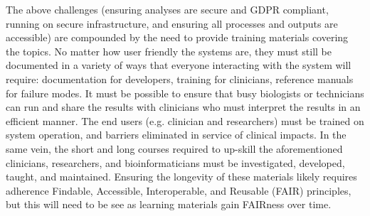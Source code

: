 

The above challenges (ensuring analyses are secure and GDPR compliant, running on secure infrastructure, and ensuring all processes and outputs are accessible) are compounded by the need to provide training materials covering the topics.
No matter how user friendly the systems are, they must still be documented in a variety of ways that everyone interacting with the system will require: documentation for developers, training for clinicians, reference manuals for failure modes. %
It must be possible to ensure that busy biologists or technicians can run and share the results with clinicians who must interpret the results in an efficient manner\cite{Kawamoto_2005}.
The end users (e.g. clinician and researchers) must be trained on system operation, and barriers eliminated in service of clinical impacts.
In the same vein, the short and long courses required to up-skill the aforementioned clinicians, researchers, and bioinformaticians must be investigated, developed, taught, and maintained\cite{Attwood_2017,Pearson_2001}.
Ensuring the longevity of these materials likely requires adherence Findable, Accessible, Interoperable, and Reusable (FAIR) principles\cite{Wilkinson_2016}, but this will need to be see as learning materials gain FAIRness over time.

